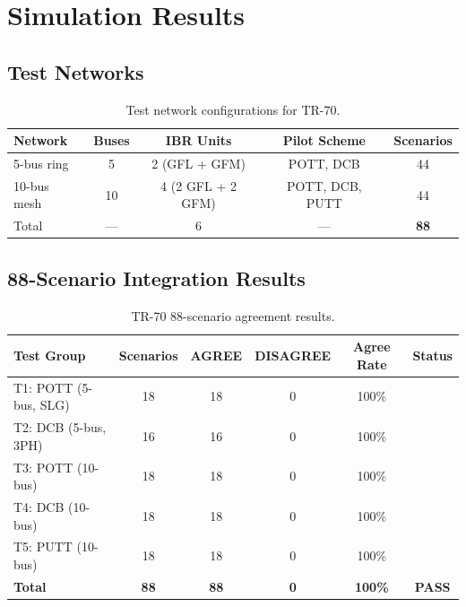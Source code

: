 \documentclass[11pt, a4paper]{article}
\newcommand{\cmark}{\ding{51}}
\begin{document}
\section{Simulation Results}
\label{sec:results}

\subsection{Test Networks}

\begin{table}[ht]
\centering
\caption{Test network configurations for TR-70.}
\label{tab:networks}
\begin{tabular}{lcccc}
\toprule
Network & Buses & IBR Units & Pilot Scheme & Scenarios \\
\midrule
5-bus ring & 5 & 2 (GFL + GFM) & POTT, DCB & 44 \\
10-bus mesh & 10 & 4 (2 GFL + 2 GFM) & POTT, DCB, PUTT & 44 \\
\midrule
Total & --- & 6 & --- & \textbf{88} \\
\bottomrule
\end{tabular}
\end{table}

\subsection{88-Scenario Integration Results}

\begin{table}[ht]
\centering
\caption{TR-70 88-scenario agreement results.}
\label{tab:results}
\begin{tabular}{lccccc}
\toprule
Test Group & Scenarios & AGREE & DISAGREE & Agree Rate & Status \\
\midrule
T1: POTT (5-bus, SLG) & 18 & 18 & 0 & 100\% & \cmark \\
T2: DCB (5-bus, 3PH)  & 16 & 16 & 0 & 100\% & \cmark \\
T3: POTT (10-bus)     & 18 & 18 & 0 & 100\% & \cmark \\
T4: DCB (10-bus)      & 18 & 18 & 0 & 100\% & \cmark \\
T5: PUTT (10-bus)     & 18 & 18 & 0 & 100\% & \cmark \\
\midrule
\textbf{Total} & \textbf{88} & \textbf{88} & \textbf{0} & \textbf{100\%}
  & \textbf{\color{okgreen}PASS} \\
\bottomrule
\end{tabular}
\end{table}
\end{document}
